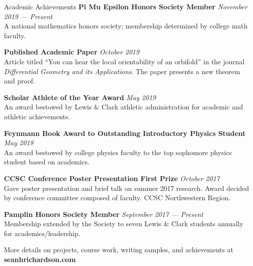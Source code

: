\documentclass{resume}
\begin{document}
\begin{rSection}{Academic Achievements} 
    \textbf{Pi Mu Epsilon Honors Society Member} \hfill \textit{November 2019 --- Present}\\
 A national mathematics honors society; membership determined by college math faculty.

	\textbf{Published Academic Paper} \hfill \textit{October 2019} \\
Article titled ``You can hear the local orientability of an orbifold'' in the journal \textit{Differential Geometry and its Applications}. The paper presents a new theorem and proof.

    \textbf{Scholar Athlete of the Year Award} \hfill \textit{May 2019}\\ 
An award bestowed by Lewis \& Clark athletic administration for academic and athletic achievements.

    \textbf{Feynmann Book Award to Outstanding Introductory Physics Student}
	\hfill \textit{May 2018}\\
    An award bestowed by college physics faculty to the top sophomore physics student based on academics.

    \textbf{CCSC Conference Poster Presentation First Prize} \hfill \textit{October 2017}\\
    Gave poster presentation and brief talk on summer 2017 research. Award decided by conference committee composed of faculty. CCSC Northwestern Region.

    \textbf{Pamplin Honors Society Member} \hfill \textit{September 2017 --- Present} \\
 Membership extended by the Society to seven Lewis \& Clark students annually for academics/leadership.

\end{rSection}

%

\begin{rSection}{}
	More details on projects, course work, writing samples, and achievements at \textbf{seanhrichardson.com}
\end{rSection}
\end{document}
